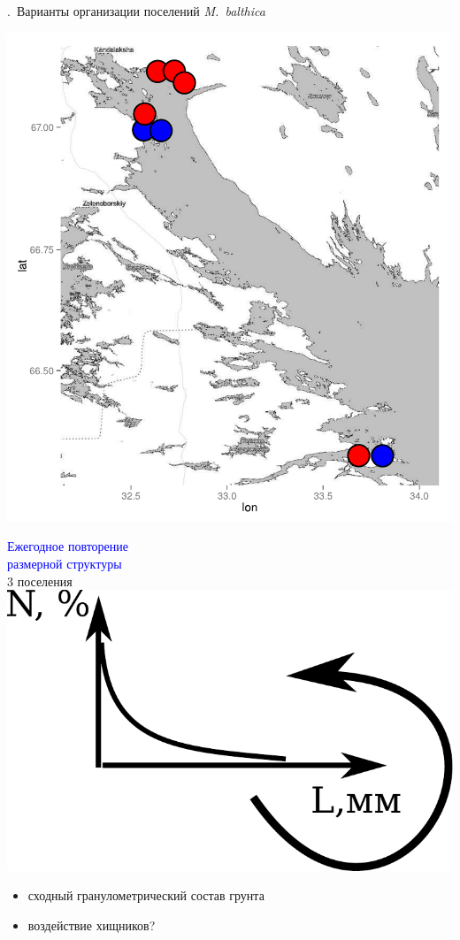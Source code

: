 \documentclass[aspectratio=169, xcolor=table]{beamer}
\begin{document}
\begin{frame}{\insertpagenumber.\ Варианты организации поселений {\it M.~balthica}}
\begin{minipage}[t]{.35\linewidth}
\begin{center}
			\includegraphics[width=\textwidth]{map_size_distr.pdf}
		\end{center}

	\end{minipage}
%
	\begin{minipage}[t]{.3\linewidth}
		\begin{center}
\textcolor{blue}{Ежегодное повторение\\ размерной структуры }\\ 3 поселения \\
			\includegraphics[width=.8\textwidth]{Dymanic_povtorenie.pdf}\\
		\end{center}
\begin{scriptsize}
	\begin{itemize}
		\item сходный гранулометрический состав грунта
		\item воздействие хищников?
	\end{itemize}
\end{scriptsize}
	\end{minipage}
\end{frame}
\end{document}
